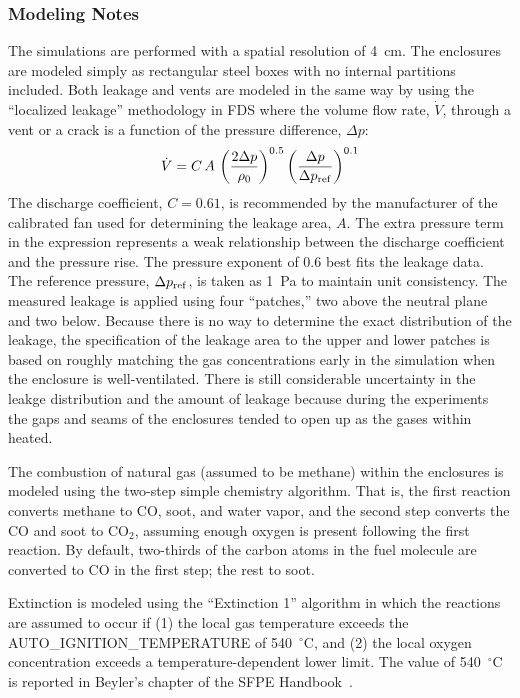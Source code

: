 \subsubsection{Modeling Notes}

The simulations are performed with a spatial resolution of 4~cm. The enclosures are modeled simply as rectangular steel boxes with no internal partitions included. Both leakage and vents are modeled in the same way by using the ``localized leakage'' methodology in FDS where the volume flow rate, $\dot{V}$, through a vent or a crack is a function of the pressure difference, $\Delta p$:
\begin{equation}
    \dot{V} = C \, A \, \left( \frac{2 \Delta p}{\rho_0} \right)^{0.5} \left( \frac{\Delta p}{\Delta p_{\rm ref}} \right)^{0.1} \label{leak_eq}
\end{equation}
The discharge coefficient, $C=0.61$, is recommended by the manufacturer of the calibrated fan used for determining the leakage area, $A$. The extra pressure term in the expression represents a weak relationship between the discharge coefficient and the pressure rise. The pressure exponent of 0.6 best fits the leakage data. The reference pressure, $\Delta p_{\rm ref}$, is taken as 1~Pa to maintain unit consistency. The measured leakage is applied using four ``patches,'' two above the neutral plane and two below. Because there is no way to determine the exact distribution of the leakage, the specification of the leakage area to the upper and lower patches is based on roughly matching the gas concentrations early in the simulation when the enclosure is well-ventilated. There is still considerable uncertainty in the leakge distribution and the amount of leakage because during the experiments the gaps and seams of the enclosures tended to open up as the gases within heated.

The combustion of natural gas (assumed to be methane) within the enclosures is modeled using the two-step simple chemistry algorithm. That is, the first reaction converts methane to CO, soot, and water vapor, and the second step converts the CO and soot to CO$_2$, assuming enough oxygen is present following the first reaction. By default, two-thirds of the carbon atoms in the fuel molecule are converted to CO in the first step; the rest to soot.

Extinction is modeled using the ``Extinction 1'' algorithm in which the reactions are assumed to occur if (1) the local gas temperature exceeds the {\ct AUTO\_IGNITION\_TEMPERATURE} of 540~$^\circ$C, and (2) the local oxygen concentration exceeds a temperature-dependent lower limit. The value of 540~$^\circ$C is reported in Beyler's chapter of the SFPE Handbook~\cite{SFPE:Beyler}.



